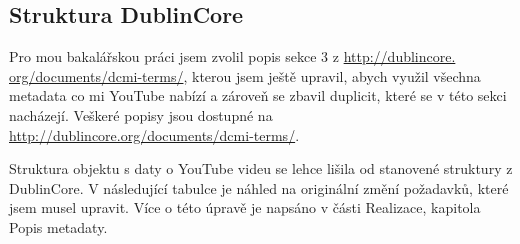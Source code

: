 \subsection{Struktura DublinCore}
\par Pro mou bakalářskou práci jsem zvolil popis sekce 3 z \url{http://dublincore.}\\\url{org/documents/dcmi-terms/}, kterou jsem ještě upravil, abych využil všechna metadata co mi YouTube nabízí a zároveň se zbavil duplicit, které se v této sekci nacházejí. Veškeré popisy jsou dostupné na \url{http://dublincore.org/documents/dcmi-terms/}.
\par Struktura objektu s daty o YouTube videu se lehce lišila od stanovené struktury z DublinCore\cite{dublincoredocementation}. V následující tabulce je náhled na originální změní požadavků, které jsem musel upravit. Více o této úpravě je napsáno v části Realizace, kapitola Popis metadaty.
\vfill
